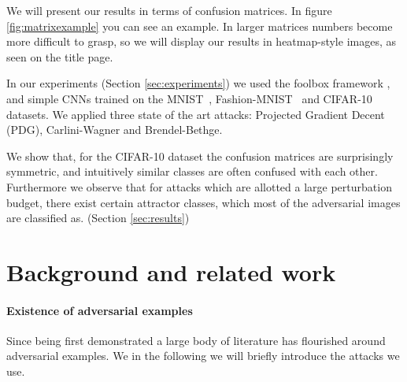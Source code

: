 \documentclass{article}
\begin{document}
We will present our results in terms of confusion matrices. In figure \ref{fig:matrixexample} you can see an example. In larger matrices numbers become more difficult to grasp, so we will display our results in heatmap-style images, as seen on the title page.

In our experiments (Section \ref{sec:experiments}) we used the foolbox framework \cite{rauber2017foolbox}, and simple CNNs trained on the MNIST~\cite{deng2012mnist}, Fashion-MNIST~\cite{deng2012mnist} and CIFAR-10~\cite{krizhevsky2009learning} datasets. We applied three state of the art attacks: Projected Gradient Decent (PDG)\cite{madry2017towards}, Carlini-Wagner \cite{carlini2017towards} and Brendel-Bethge\cite{brendel2019accurate}.

We show that, for the CIFAR-10 dataset the confusion matrices are surprisingly symmetric, and intuitively similar classes are often confused with each other. Furthermore we observe that for attacks which are allotted a large perturbation budget, there exist certain attractor classes, which most of the adversarial images are classified as. (Section \ref{sec:results})

%



\section{Background and related work}

\paragraph{Existence of adversarial examples}
Since being first demonstrated \cite{Szegedy13} a large body of literature has flourished around adversarial examples. We in the following we will briefly introduce the attacks we use.
\end{document}
